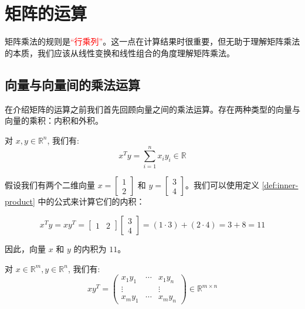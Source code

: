 \section{矩阵的运算}

\begin{note}
矩阵乘法的规则是\textcolor{red}{“行乘列”}。这一点在计算结果时很重要，但无助于理解矩阵乘法的本质，我们应该从线性变换和线性组合的角度理解矩阵乘法。
\end{note}

\subsection{向量与向量间的乘法运算}

在介绍矩阵的运算之前我们首先回顾向量之间的乘法运算。存在两种类型的向量与向量的乘积：内积和外积。

\begin{definition}[内积] \label{def:inner-product} 
对 $x, y \in \mathbb{R}^n$, 我们有:
$$
x^T y=\sum_{i=1}^n x_i y_i \in \mathbb{R}
$$
\end{definition}

\begin{exercise}\label{exer:01}
假设我们有两个二维向量 $x = \begin{bmatrix} 1 \\ 2 \end{bmatrix}$ 和 $y = \begin{bmatrix} 3 \\ 4 \end{bmatrix}$。我们可以使用定义 \ref{def:inner-product} 中的公式来计算它们的内积：

\[
x^T y = x y^T = \begin{bmatrix} 1 & 2 \end{bmatrix} \begin{bmatrix} 3 \\ 4 \end{bmatrix} = (1 \cdot 3) + (2 \cdot 4) = 3 + 8 = 11
\]

因此，向量 $x$ 和 $y$ 的内积为 $11$。
\end{exercise}

\begin{definition}[外积] \label{def:outer-product} 
对 $x \in \mathbb{R}^m, y \in \mathbb{R}^n$, 我们有:
$$
x y^T=\left(\begin{array}{ccc}
x_1 y_1 & \cdots & x_1 y_n \\
\vdots & & \vdots \\
x_m y_1 & \cdots & x_m y_n
\end{array}\right) \in \mathbb{R}^{m \times n}
$$
\end{definition}

